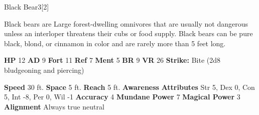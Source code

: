       
  \begin{monsubsection}{Black Bear}{3}[2]
    \vspace{-1em}\vspace{-1em}
    \vspace{0em}

    
            Black bears are Large forest-dwelling omnivores that are usually not dangerous unless an interloper threatens their cubs or food supply.
            Black bears can be pure black, blond, or cinnamon in color and are rarely more than 5 feet long.
          

    \begin{spellcontent}
      \begin{spelltargetinginfo}
        \pari \textbf{HP} 12 \monsep
          \textbf{AD} 9 \monsep
          \textbf{Fort} 11 \monsep
          \textbf{Ref} 7 \monsep
          \textbf{Ment} 5
        \pari \textbf{BR} 9 \monsep
        \textbf{VR} 26
        \pari \textbf{Strike:}
            Bite  (2d8 bludgeoning and piercing)
      \end{spelltargetinginfo}
    \end{spellcontent}
    \begin{monsterfooter}
      \pari \textbf{Speed} 30 ft. \monsep
        \textbf{Space} 5 ft. \monsep
        \textbf{Reach} 5 ft.
      \pari \textbf{Awareness} 
      \pari \textbf{Attributes}
        Str 5, Dex 0,
        Con 5, Int -8,
        Per 0, Wil -1
      \pari \textbf{Accuracy} 4 \monsep
        \textbf{Mundane Power} 7 \monsep
      \textbf{Magical Power} 3
      \pari \textbf{Alignment} Always true neutral
    \end{monsterfooter}
  \end{monsubsection}
  
  

